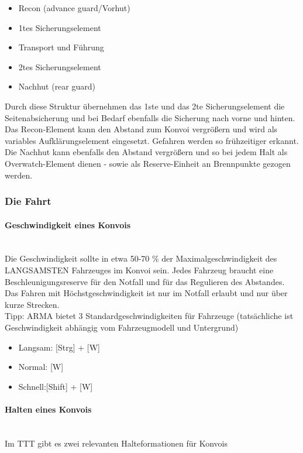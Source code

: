 	\begin{itemize}
		\item Recon (advance guard/Vorhut)
		\item 1tes Sicherungselement
		\item Transport und Führung
		\item 2tes Sicherungselement
		\item Nachhut (rear guard)
	\end{itemize}

	Durch diese Struktur übernehmen das 1ste und das 2te Sicherungselement die Seitenabsicherung und bei Bedarf ebenfalls die Sicherung nach vorne und hinten. Das Recon-Element kann den Abstand zum Konvoi vergrößern und wird als variables Aufklärungselement eingesetzt. Gefahren werden so frühzeitiger erkannt. Die Nachhut kann ebenfalls den Abstand vergrößern und so bei jedem Halt als Overwatch-Element dienen - sowie als Reserve-Einheit an Brennpunkte gezogen werden. \\

\subsubsection{Die Fahrt}
\paragraph{Geschwindigkeit eines Konvois} \ \\
	Die Geschwindigkeit sollte in etwa 50-70 \% der Maximalgeschwindigkeit des LANGSAMSTEN Fahrzeuges im Konvoi sein. Jedes Fahrzeug braucht eine Beschleunigungsreserve für den Notfall und für das Regulieren des Abstandes. Das Fahren mit Höchstgeschwindigkeit ist nur im Notfall erlaubt und nur über kurze Strecken. \\
	Tipp: ARMA bietet 3 Standardgeschwindigkeiten für Fahrzeuge (tatsächliche ist Geschwindigkeit abhängig vom Fahrzeugmodell und Untergrund) \\

	\begin{itemize}
		\item Langsam: [Strg] + [W]
		\item Normal: [W]
		\item Schnell:[Shift] + [W]
	\end{itemize}

\paragraph{Halten eines Konvois} \ \\
	Im TTT gibt es zwei relevanten Halteformationen für Konvois

